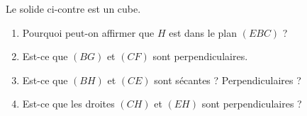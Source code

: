 
\begin{exercice}\label{exoSeconde-0087}

    \begin{multicols}{2}
            Le solide ci-contre est un cube. 
        \begin{enumerate}
            \item
                Pourquoi peut-on affirmer que \( H\) est dans le plan \( (EBC)\) ?
            \item
                Est-ce que \( (BG)\) et \( (CF)\) sont perpendiculaires.
    \item
                Est-ce que \( (BH)\) et \( (CE)\) sont sécantes ? Perpendiculaires ?
    \item
        Est-ce que les droites \( (CH)\) et \( (EH)\) sont perpendiculaires ?
        \end{enumerate}

\columnbreak

\begin{center}

\end{center}

    \end{multicols}

\end{exercice}
